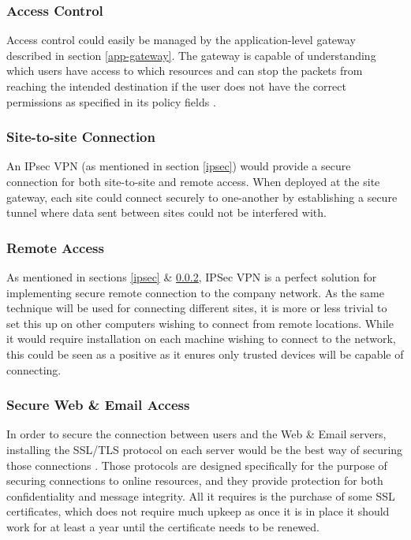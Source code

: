 \documentclass[11pt]{article}
\begin{document}
        \subsubsection{Access Control}
          Access control could easily be managed by the application-level gateway described in section \ref{app-gateway}. The gateway is capable of understanding which users have access to which resources and can stop the packets from reaching the intended destination if the user does not have the correct permissions as specified in its policy fields \citep{openAppGateway}.

        \subsubsection{Site-to-site Connection} \label{ipsec2}
          An IPsec VPN (as mentioned in section \ref{ipsec}) would provide a secure connection for both site-to-site and remote access. When deployed at the site gateway, each site could connect securely to one-another by establishing a secure tunnel where data sent between sites could not be interfered with.

        \subsubsection{Remote Access}
          As mentioned in sections \ref{ipsec} \& \ref{ipsec2}, IPSec VPN is a perfect solution for implementing secure remote connection to the company network. As the same technique will be used for connecting different sites, it is more or less trivial to set this up on other computers wishing to connect from remote locations. While it would require installation on each machine wishing to connect to the network, this could be seen as a positive as it enures only trusted devices will be capable of connecting.

        \subsubsection{Secure Web \& Email Access}
          In order to secure the connection between users and the Web \& Email servers, installing the SSL/TLS protocol on each server would be the best way of securing those connections \citep{ncsc2017tls}. Those protocols are designed specifically for the purpose of securing connections to online resources, and they provide protection for both confidentiality and message integrity. All it requires is the purchase of some SSL certificates, which does not require much upkeep as once it is in place it should work for at least a year until the certificate needs to be renewed.
\end{document}
